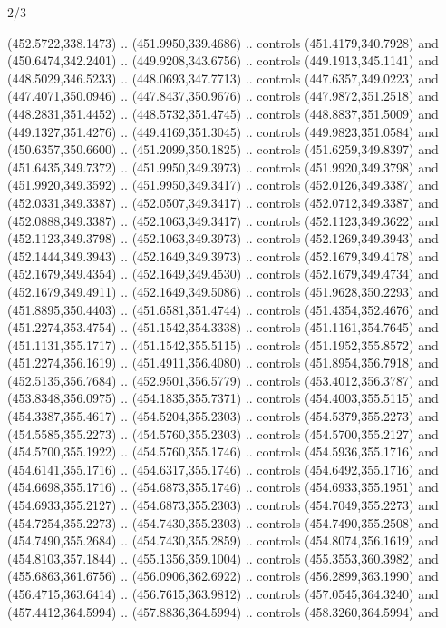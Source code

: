 \begin{flagdescription}{2/3}
\begin{scope}[xshift=0.5\flaglength,yshift=0.5\flagwidth,scale=\flagwidth/495.65]
\begin{scope}[y=0.8pt, x=0.8pt, yscale=-1,shift={(-463.76,-309.78)}]
  (452.5722,338.1473) .. (451.9950,339.4686) .. controls (451.4179,340.7928) and
  (450.6474,342.2401) .. (449.9208,343.6756) .. controls (449.1913,345.1141) and
  (448.5029,346.5233) .. (448.0693,347.7713) .. controls (447.6357,349.0223) and
  (447.4071,350.0946) .. (447.8437,350.9676) .. controls (447.9872,351.2518) and
  (448.2831,351.4452) .. (448.5732,351.4745) .. controls (448.8837,351.5009) and
  (449.1327,351.4276) .. (449.4169,351.3045) .. controls (449.9823,351.0584) and
  (450.6357,350.6600) .. (451.2099,350.1825) .. controls (451.6259,349.8397) and
  (451.6435,349.7372) .. (451.9950,349.3973) .. controls (451.9920,349.3798) and
  (451.9920,349.3592) .. (451.9950,349.3417) .. controls (452.0126,349.3387) and
  (452.0331,349.3387) .. (452.0507,349.3417) .. controls (452.0712,349.3387) and
  (452.0888,349.3387) .. (452.1063,349.3417) .. controls (452.1123,349.3622) and
  (452.1123,349.3798) .. (452.1063,349.3973) .. controls (452.1269,349.3943) and
  (452.1444,349.3943) .. (452.1649,349.3973) .. controls (452.1679,349.4178) and
  (452.1679,349.4354) .. (452.1649,349.4530) .. controls (452.1679,349.4734) and
  (452.1679,349.4911) .. (452.1649,349.5086) .. controls (451.9628,350.2293) and
  (451.8895,350.4403) .. (451.6581,351.4744) .. controls (451.4354,352.4676) and
  (451.2274,353.4754) .. (451.1542,354.3338) .. controls (451.1161,354.7645) and
  (451.1131,355.1717) .. (451.1542,355.5115) .. controls (451.1952,355.8572) and
  (451.2274,356.1619) .. (451.4911,356.4080) .. controls (451.8954,356.7918) and
  (452.5135,356.7684) .. (452.9501,356.5779) .. controls (453.4012,356.3787) and
  (453.8348,356.0975) .. (454.1835,355.7371) .. controls (454.4003,355.5115) and
  (454.3387,355.4617) .. (454.5204,355.2303) .. controls (454.5379,355.2273) and
  (454.5585,355.2273) .. (454.5760,355.2303) .. controls (454.5700,355.2127) and
  (454.5700,355.1922) .. (454.5760,355.1746) .. controls (454.5936,355.1716) and
  (454.6141,355.1716) .. (454.6317,355.1746) .. controls (454.6492,355.1716) and
  (454.6698,355.1716) .. (454.6873,355.1746) .. controls (454.6933,355.1951) and
  (454.6933,355.2127) .. (454.6873,355.2303) .. controls (454.7049,355.2273) and
  (454.7254,355.2273) .. (454.7430,355.2303) .. controls (454.7490,355.2508) and
  (454.7490,355.2684) .. (454.7430,355.2859) .. controls (454.8074,356.1619) and
  (454.8103,357.1844) .. (455.1356,359.1004) .. controls (455.3553,360.3982) and
  (455.6863,361.6756) .. (456.0906,362.6922) .. controls (456.2899,363.1990) and
  (456.4715,363.6414) .. (456.7615,363.9812) .. controls (457.0545,364.3240) and
  (457.4412,364.5994) .. (457.8836,364.5994) .. controls (458.3260,364.5994) and

\end{scope}
\end{scope}
\end{flagdescription}
